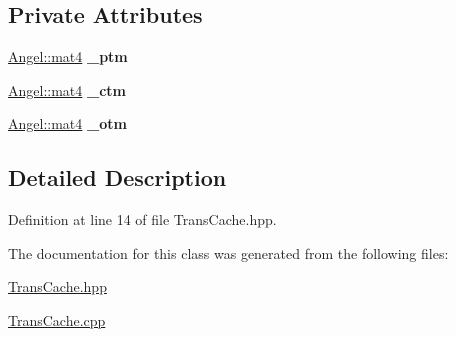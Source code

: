 \subsection*{Private Attributes}
\begin{DoxyCompactItemize}
\item 
\hypertarget{class_trans_cache_a3f620418592ae6bedde06d55261bba36}{\hyperlink{class_angel_1_1mat4}{Angel\-::mat4} {\bfseries \-\_\-ptm}}\label{class_trans_cache_a3f620418592ae6bedde06d55261bba36}

\item 
\hypertarget{class_trans_cache_a5bb6920889e36c616bd1648192ff5136}{\hyperlink{class_angel_1_1mat4}{Angel\-::mat4} {\bfseries \-\_\-ctm}}\label{class_trans_cache_a5bb6920889e36c616bd1648192ff5136}

\item 
\hypertarget{class_trans_cache_a968b1ec19687e1839f471658c63563a9}{\hyperlink{class_angel_1_1mat4}{Angel\-::mat4} {\bfseries \-\_\-otm}}\label{class_trans_cache_a968b1ec19687e1839f471658c63563a9}

\end{DoxyCompactItemize}


\subsection{Detailed Description}


Definition at line 14 of file Trans\-Cache.\-hpp.



The documentation for this class was generated from the following files\-:\begin{DoxyCompactItemize}
\item 
\hyperlink{_trans_cache_8hpp}{Trans\-Cache.\-hpp}\item 
\hyperlink{_trans_cache_8cpp}{Trans\-Cache.\-cpp}\end{DoxyCompactItemize}
